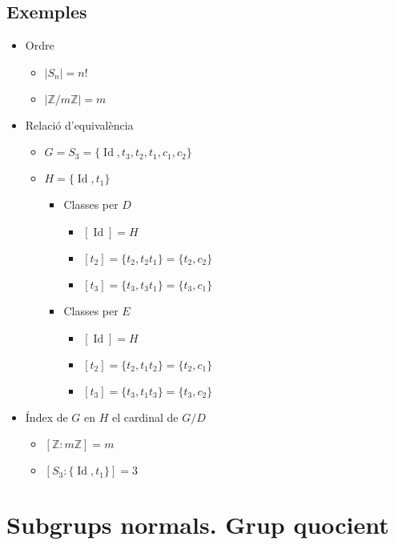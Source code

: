 \documentclass{article}
\DeclareMathOperator{\Id}{Id}
\newcommand{\Z}{\mathbb{Z}}
\begin{document}
\subsection*{Exemples}
\begin{itemize}
\item Ordre
	\begin{itemize}
	\item $|S_n| = n!$
	\item $|\Z/m\Z| = m$
	\end{itemize}
\item Relació d'equivalència
	\begin{itemize}
	\item $G = S_3 = \{\Id, t_3, t_2, t_1, c_1, c_2\}$
	\item $H = \{\Id, t_1\}$
		\begin{itemize}
		\item Classes per $D$
			\begin{itemize}
			\item $[\Id] = H$
			\item $[t_2] = \{t_2, t_2t_1\} = \{t_2, c_2\}$
			\item $[t_3] = \{t_3, t_3t_1\} = \{t_3, c_1\}$
			\end{itemize}
		\item Classes per $E$
			\begin{itemize}
			\item $[\Id] = H$
			\item $[t_2] = \{t_2, t_1t_2\} = \{t_2, c_1\}$
			\item $[t_3] = \{t_3, t_1t_3\} = \{t_3, c_2\}$
			\end{itemize}
		\end{itemize}
	\end{itemize}
\item Índex de $G$ en $H$ el cardinal de $G/D$
	\begin{itemize}
	\item $[\Z:m\Z] = m$
	\item $[S_3: \{\Id, t_1\}] = 3$
	\end{itemize}
\end{itemize}

\section{Subgrups normals. Grup quocient}
\end{document}
